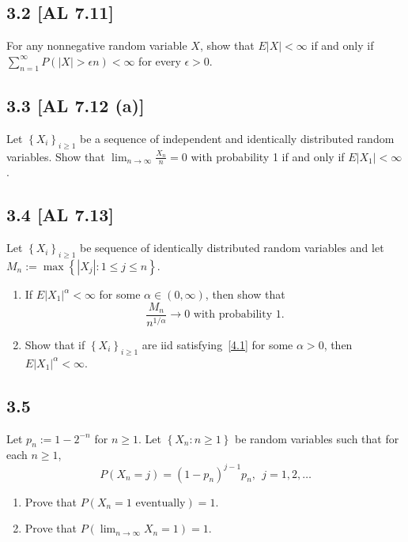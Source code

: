 \documentclass[12pt]{article}
\begin{document}
\subsection*{3.2 [AL 7.11]}
\begin{tcolorbox}
For any nonnegative random variable $X$, show that $E|X| < \infty$ if and only if $\sum_{n=1}^{\infty}P(|X| > \epsilon n) < \infty$ for every
$\epsilon > 0$.
\end{tcolorbox}


\subsection*{3.3 [AL 7.12 (a)]}
\begin{tcolorbox}
Let $\left\{ X_{i} \right\}_{i\geq 1}$ be a sequence of independent and identically distributed random variables. Show that
$\lim_{n\rightarrow\infty}\frac{X_{n}}{n} = 0$ with probability 1 if and only if $E|X_{1}| < \infty$.
\end{tcolorbox}


\subsection*{3.4 [AL 7.13]}
\begin{tcolorbox}
Let $\left\{ X_{i} \right\}_{i\geq 1}$ be sequence of identically distributed random variables and let $M_{n} := \max\left\{ |X_{j}| : 1 \leq j \leq n
\right\}$.
\begin{enumerate}[label=(\alph*)]
\item If $E|X_{1}|^{\alpha} < \infty$ for some $\alpha \in (0,\infty)$, then show that 
\begin{equation}
\frac{M_{n}}{n^{1/\alpha}} \rightarrow 0 \text{ with probability 1}. 
\label{4.1}
\end{equation}
\item Show that if $\left\{ X_{i} \right\}_{i\geq 1}$ are iid satisfying~\eqref{4.1} for some $\alpha > 0$, then $E|X_{1}|^{\alpha} < \infty$.
\end{enumerate}
\end{tcolorbox}


\subsection*{3.5}
\begin{tcolorbox}
Let $p_{n} := 1 - 2^{-n}$ for $n \geq 1$. Let $\left\{ X_{n} : n\geq 1 \right\}$ be random variables such that for each $n \geq 1$,
\[ P(X_{n} = j) = (1 - p_{n})^{j-1}p_{n}, \ \ j = 1, 2, \hdots \]
\begin{enumerate}[label=(\alph*)]
\item Prove that $P(X_{n} = 1 \text{ eventually}) = 1$.
\item Prove that $P(\lim_{n\rightarrow\infty} X_{n} = 1) = 1$.
\end{enumerate}
\end{tcolorbox}
\end{document}
